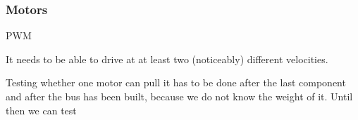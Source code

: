 \subsubsection{Motors} \label{analysisMotors}

PWM

It needs to be able to drive at at least two (noticeably) different velocities.

Testing whether one motor can pull it has to be done after the last component and after the bus has been built, because we do not know the weight of it. 
Until then we can test 

